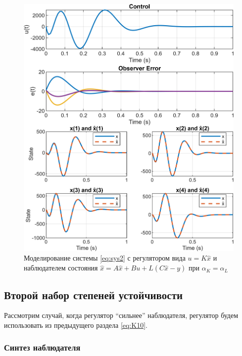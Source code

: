 \begin{figure}[H]
    \centering
    \includegraphics[width=\linewidth]{figs/task2_1.png}
    \caption{Моделирование системы \eqref{eq:sys2} с регулятором вида $u=K\hat x$
    и наблюдателем состояния $\dot{\hat x}=A\hat x+Bu+L(C\hat x-y)$ при $\alpha_K=\alpha_L$}
    \label{fig:21}
\end{figure}


\newpage
\subsection{Второй набор степеней устойчивости}


Рассмотрим случай, когда регулятор ``сильнее'' наблюдателя, регулятор будем
использовать из предыдущего раздела \autoref{eq:K10}.


\subsubsection{Синтез наблюдателя}

